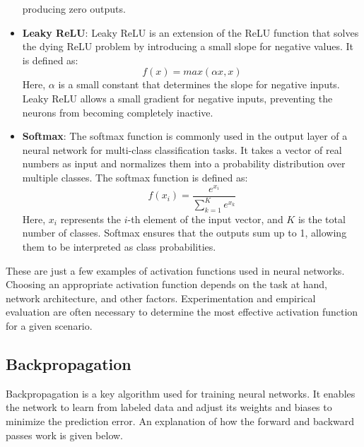 \documentclass[a4paper, noexaminfo]{sapthesis}
\begin{document}
\begin{itemize}
producing zero outputs.
\item \textbf{Leaky ReLU}: Leaky ReLU is an extension of the ReLU function 
that solves the dying ReLU problem by introducing a small slope for 
negative values. It is defined as:
\begin{equation}
f(x)=max(\alpha x,x)
\end{equation}
Here, $\alpha$ is a small constant that determines the slope for 
negative inputs. Leaky ReLU allows a small gradient for negative 
inputs, preventing the neurons from becoming completely inactive.
\item \textbf{Softmax}: The softmax function is commonly used in the 
output layer of a neural network for multi-class classification tasks. 
It takes a vector of real numbers as input and normalizes them into a 
probability distribution over multiple classes. The softmax function is 
defined as:
\begin{equation}
f(x_i)=\frac{e^{x_i}}{\sum_{k=1}^{K}e^{x_k}}
\end{equation}
Here, $x_i$ represents the $i$-th element of the input vector, 
and $K$ is the total number of classes. Softmax ensures that the 
outputs sum up to 1, allowing them to be interpreted as class 
probabilities.
\end{itemize}
These are just a few examples of activation functions used in neural 
networks. Choosing an appropriate activation function depends on the 
task at hand, network architecture, and other factors. Experimentation 
and empirical evaluation are often necessary to determine the most 
effective activation function for a given scenario.
\subsection{Backpropagation}\label{sec:backpropagation}
Backpropagation is a key algorithm used for training neural networks. 
It enables the network to learn from labeled data and adjust its weights 
and biases to minimize the prediction error. An explanation of 
how the forward and backward passes work is given below.
\end{document}
